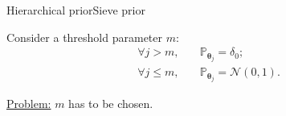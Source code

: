 \documentclass[10pt]{beamer}
\begin{document}
\begin{frame}{Hierarchical prior}{Sieve prior}

Consider a \textcolor{red!90!black}{threshold parameter} $m$:
\begin{align*}
\forall j > m ,& \quad \mathbb{P}_{\boldsymbol{\theta}_{j}} = \delta_{0};\\
\forall j \leq m ,& \quad \mathbb{P}_{\boldsymbol{\theta}_{j}} = \mathcal{N}\left(0, 1\right).
\end{align*}
%

\underline{Problem:} $m$ has to be chosen.

\end{frame}
\end{document}
